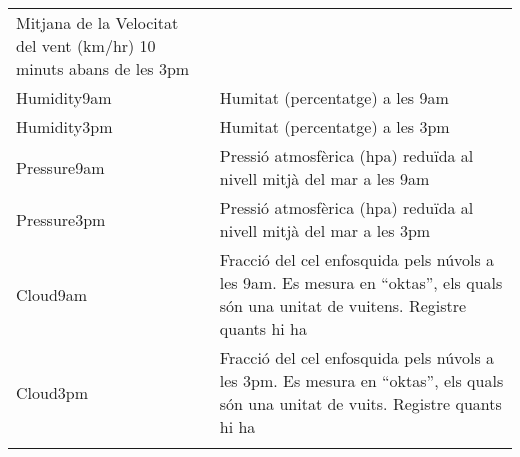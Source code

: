 \documentclass[
]{article}
\begin{document}
\begin{longtable}[]{@{}ll@{}}
\begin{minipage}[t]{0.75\columnwidth}
Mitjana de la Velocitat del vent (km/hr) 10 minuts abans de les
3pm\strut
\end{minipage}\tabularnewline
\begin{minipage}[t]{0.19\columnwidth}\raggedright
Humidity9am\strut
\end{minipage} & \begin{minipage}[t]{0.75\columnwidth}\raggedright
Humitat (percentatge) a les 9am\strut
\end{minipage}\tabularnewline
\begin{minipage}[t]{0.19\columnwidth}\raggedright
Humidity3pm\strut
\end{minipage} & \begin{minipage}[t]{0.75\columnwidth}\raggedright
Humitat (percentatge) a les 3pm\strut
\end{minipage}\tabularnewline
\begin{minipage}[t]{0.19\columnwidth}\raggedright
Pressure9am\strut
\end{minipage} & \begin{minipage}[t]{0.75\columnwidth}\raggedright
Pressió atmosfèrica (hpa) reduïda al nivell mitjà del mar a les
9am\strut
\end{minipage}\tabularnewline
\begin{minipage}[t]{0.19\columnwidth}\raggedright
Pressure3pm\strut
\end{minipage} & \begin{minipage}[t]{0.75\columnwidth}\raggedright
Pressió atmosfèrica (hpa) reduïda al nivell mitjà del mar a les
3pm\strut
\end{minipage}\tabularnewline
\begin{minipage}[t]{0.19\columnwidth}\raggedright
Cloud9am\strut
\end{minipage} & \begin{minipage}[t]{0.75\columnwidth}\raggedright
Fracció del cel enfosquida pels núvols a les 9am. Es mesura en
``oktas'', els quals són una unitat de vuitens. Registre quants hi
ha\strut
\end{minipage}\tabularnewline
\begin{minipage}[t]{0.19\columnwidth}\raggedright
Cloud3pm\strut
\end{minipage} & \begin{minipage}[t]{0.75\columnwidth}\raggedright
Fracció del cel enfosquida pels núvols a les 3pm. Es mesura en
``oktas'', els quals són una unitat de vuits. Registre quants hi
ha\strut
\end{minipage}\tabularnewline
\begin{minipage}[t]{0.19\columnwidth}\raggedright

\end{minipage}
\end{longtable}
\end{document}
